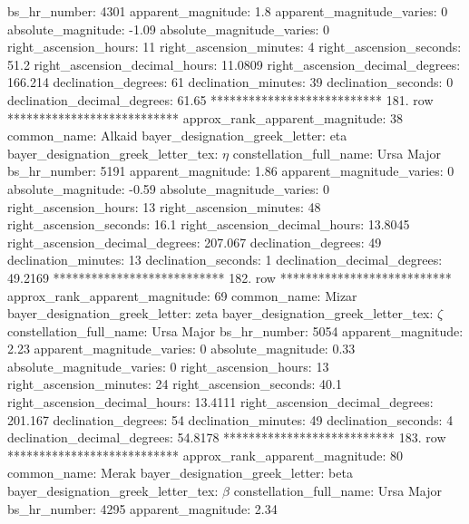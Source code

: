                       bs_hr_number: 4301
                apparent_magnitude: 1.8
         apparent_magnitude_varies: 0
                absolute_magnitude: -1.09
         absolute_magnitude_varies: 0
             right_ascension_hours: 11
           right_ascension_minutes: 4
           right_ascension_seconds: 51.2
     right_ascension_decimal_hours: 11.0809
   right_ascension_decimal_degrees: 166.214
               declination_degrees: 61
               declination_minutes: 39
               declination_seconds: 0
       declination_decimal_degrees: 61.65
*************************** 181. row ***************************
    approx_rank_apparent_magnitude: 38
                       common_name: Alkaid
    bayer_designation_greek_letter: eta
bayer_designation_greek_letter_tex: $\eta$
           constellation_full_name: Ursa Major
                      bs_hr_number: 5191
                apparent_magnitude: 1.86
         apparent_magnitude_varies: 0
                absolute_magnitude: -0.59
         absolute_magnitude_varies: 0
             right_ascension_hours: 13
           right_ascension_minutes: 48
           right_ascension_seconds: 16.1
     right_ascension_decimal_hours: 13.8045
   right_ascension_decimal_degrees: 207.067
               declination_degrees: 49
               declination_minutes: 13
               declination_seconds: 1
       declination_decimal_degrees: 49.2169
*************************** 182. row ***************************
    approx_rank_apparent_magnitude: 69
                       common_name: Mizar
    bayer_designation_greek_letter: zeta
bayer_designation_greek_letter_tex: $\zeta$
           constellation_full_name: Ursa Major
                      bs_hr_number: 5054
                apparent_magnitude: 2.23
         apparent_magnitude_varies: 0
                absolute_magnitude: 0.33
         absolute_magnitude_varies: 0
             right_ascension_hours: 13
           right_ascension_minutes: 24
           right_ascension_seconds: 40.1
     right_ascension_decimal_hours: 13.4111
   right_ascension_decimal_degrees: 201.167
               declination_degrees: 54
               declination_minutes: 49
               declination_seconds: 4
       declination_decimal_degrees: 54.8178
*************************** 183. row ***************************
    approx_rank_apparent_magnitude: 80
                       common_name: Merak
    bayer_designation_greek_letter: beta
bayer_designation_greek_letter_tex: $\beta$
           constellation_full_name: Ursa Major
                      bs_hr_number: 4295
                apparent_magnitude: 2.34
